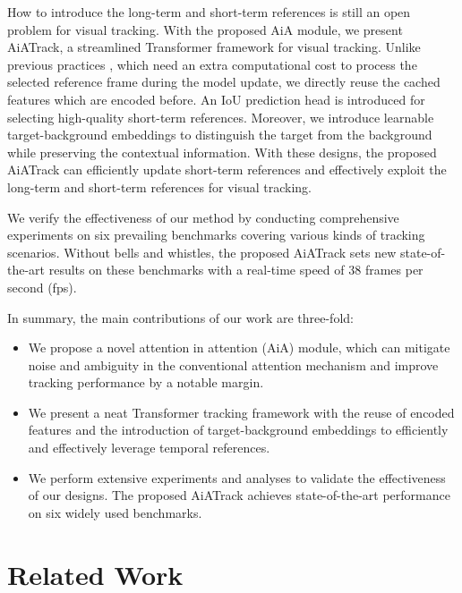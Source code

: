 \documentclass[runningheads]{llncs}
\begin{document}
How to introduce the long-term and short-term references is still an open problem for visual tracking. With the proposed AiA module, we present AiATrack, a streamlined Transformer framework for visual tracking. Unlike previous practices \cite{zhang2019learning,fu2021stmtrack,wang2021transformer,yan2021learning}, which need an extra computational cost to process the selected reference frame during the model update, we directly reuse the cached features which are encoded before. An IoU prediction head is introduced for selecting high-quality short-term references. Moreover, we introduce learnable target-background embeddings to distinguish the target from the background while preserving the contextual information. With these designs, the proposed AiATrack can efficiently update short-term references and effectively exploit the long-term and short-term references for visual tracking.

We verify the effectiveness of our method by conducting comprehensive experiments on six prevailing benchmarks covering various kinds of tracking scenarios. Without bells and whistles, the proposed AiATrack sets new state-of-the-art results on these benchmarks with a real-time speed of 38 frames per second (fps).

In summary, the main contributions of our work are three-fold:
\begin{itemize}
    \item[] We propose a novel attention in attention (AiA) module, which can mitigate noise and ambiguity in the conventional attention mechanism \cite{vaswani2017attention} and improve tracking performance by a notable margin.
    \item[] We present a neat Transformer tracking framework with the reuse of encoded features and the introduction of target-background embeddings to efficiently and effectively leverage temporal references.
    \item[] We perform extensive experiments and analyses to validate the effectiveness of our designs. The proposed AiATrack achieves state-of-the-art performance on six widely used benchmarks.
\end{itemize}

\section{Related Work}
\end{document}
